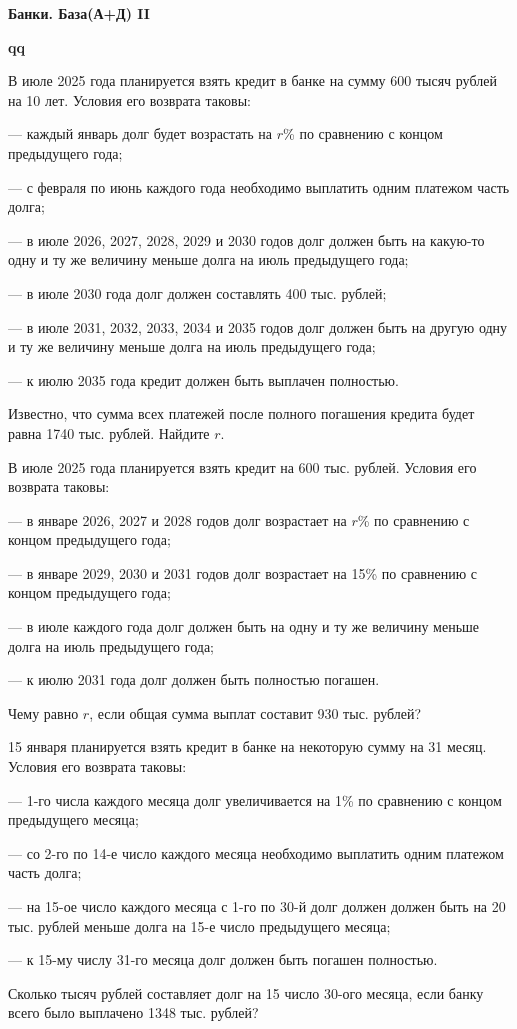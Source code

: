 \centerline{\bf \Huge Банки. База(А+Д) II}
\centerline{\bf \Huge }

\begin{flushright}
        \scriptsize{\textbf{qq}}
\end{flushright}


 В июле 2025 года планируется взять кредит в банке на сумму 600 тысяч рублей на 10 лет. Условия его возврата таковы:

— каждый январь долг будет возрастать на $r$\% по сравнению с концом предыдущего года;

— с февраля по июнь каждого года необходимо выплатить одним платежом часть долга;

— в июле 2026, 2027, 2028, 2029 и 2030 годов долг должен быть на какую-то одну и ту же
величину меньше долга на июль предыдущего года;

— в июле 2030 года долг должен составлять 400 тыс. рублей;

— в июле 2031, 2032, 2033, 2034 и 2035 годов долг должен быть на другую одну и ту же
величину меньше долга на июль предыдущего года;

— к июлю 2035 года кредит должен быть выплачен полностью.

Известно, что сумма всех платежей после полного погашения кредита будет равна 1740 тыс.
рублей. Найдите $r$.

 В июле 2025 года планируется взять кредит на 600 тыс. рублей. Условия его возврата таковы:

— в январе 2026, 2027 и 2028 годов долг возрастает на $r$\% по сравнению с концом предыдущего года;

— в январе 2029, 2030 и 2031 годов долг возрастает на 15\% по сравнению с концом предыдущего года;

— в июле каждого года долг должен быть на одну и ту же величину меньше долга на июль
предыдущего года;

— к июлю 2031 года долг должен быть полностью погашен.

Чему равно $r$, если общая сумма выплат составит 930 тыс. рублей?

 15 января планируется взять кредит в банке на некоторую сумму на 31 месяц. Условия его возврата таковы:

— 1-го числа каждого месяца долг увеличивается на 1\% по сравнению с концом предыдущего
месяца;

— со 2-го по 14-е число каждого месяца необходимо выплатить одним платежом часть долга;

— на 15-ое число каждого месяца с 1-го по 30-й долг должен должен быть на 20 тыс. рублей
меньше долга на 15-е число предыдущего месяца;

— к 15-му числу 31-го месяца долг должен быть погашен полностью.

Сколько тысяч рублей составляет долг на 15 число 30-ого месяца, если банку всего было
выплачено 1348 тыс. рублей?
